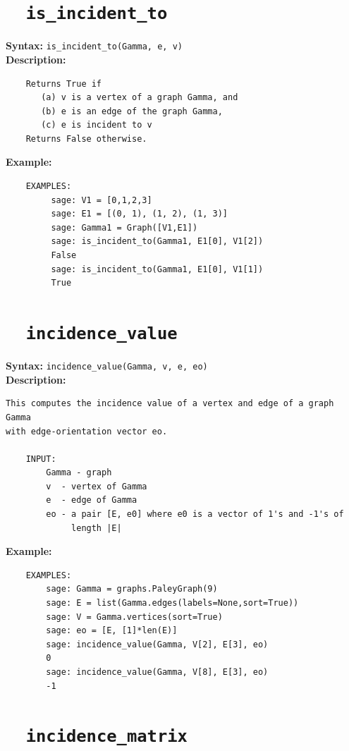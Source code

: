 \documentclass{article}
\begin{document}
\section{\tt \ \ is\_incident\_to}

\textbf{Syntax:} \verb}is_incident_to(Gamma, e, v)}\\

\textbf{Description:}
\begin{verbatim}
    Returns True if 
       (a) v is a vertex of a graph Gamma, and
       (b) e is an edge of the graph Gamma,
       (c) e is incident to v
    Returns False otherwise.
\end{verbatim}

\textbf{Example:}
\begin{verbatim}
    EXAMPLES:
         sage: V1 = [0,1,2,3]
         sage: E1 = [(0, 1), (1, 2), (1, 3)]
         sage: Gamma1 = Graph([V1,E1])
         sage: is_incident_to(Gamma1, E1[0], V1[2])
         False
         sage: is_incident_to(Gamma1, E1[0], V1[1])
         True
\end{verbatim}

\section{\tt \ \ incidence\_value}

\textbf{Syntax:} \verb}incidence_value(Gamma, v, e, eo)}\\

\textbf{Description:}
\begin{verbatim}
This computes the incidence value of a vertex and edge of a graph Gamma
with edge-orientation vector eo. 

    INPUT:
        Gamma - graph
        v  - vertex of Gamma
        e  - edge of Gamma  
        eo - a pair [E, e0] where e0 is a vector of 1's and -1's of 
             length |E|
\end{verbatim}

\textbf{Example:}
\begin{verbatim}
    EXAMPLES:
        sage: Gamma = graphs.PaleyGraph(9)
        sage: E = list(Gamma.edges(labels=None,sort=True))
        sage: V = Gamma.vertices(sort=True)
        sage: eo = [E, [1]*len(E)]
        sage: incidence_value(Gamma, V[2], E[3], eo)
        0
        sage: incidence_value(Gamma, V[8], E[3], eo)
        -1
\end{verbatim}

\section{\tt \ \ incidence\_matrix}
\end{document}
